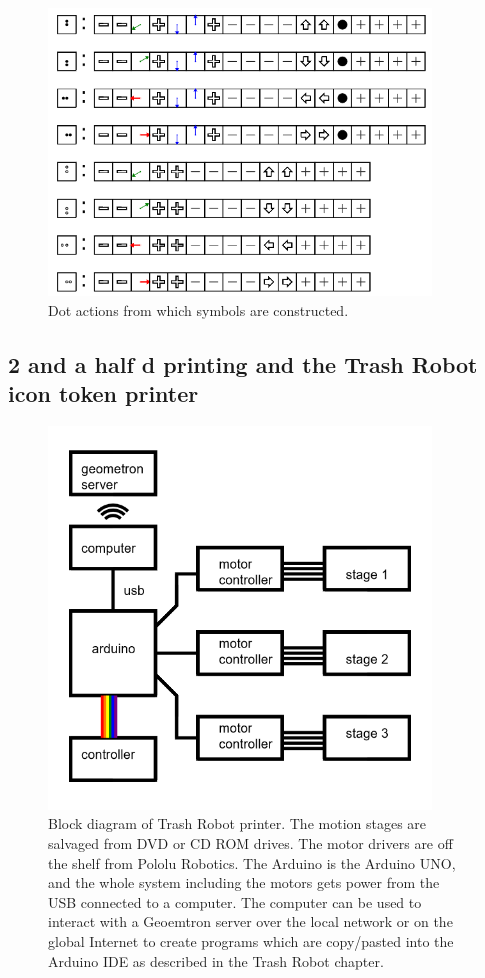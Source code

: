 \begin{figure}
	\centering
	\includegraphics[width=4in]{figures/machines/actions05xx.png}
	\caption[actions05xx]
	{Dot actions from which symbols are constructed.}
\end{figure}


\subsection{2 and a half d printing and the Trash Robot icon token printer}


\begin{figure}
	\centering
	\includegraphics[width=4in]{figures/machines/printerblockdiagram.png}
	\caption[printerblockdiagram]
	{Block diagram of Trash Robot printer.  The motion stages are salvaged from DVD or CD ROM drives.  The motor drivers are off the shelf from Pololu Robotics.  The Arduino is the Arduino UNO, and the whole system including the motors gets power from the USB connected to a computer.  The computer can be used to interact with a Geoemtron server over the local network or on the global Internet to create programs which are copy/pasted into the Arduino IDE as described in the Trash Robot chapter.}
\end{figure}


